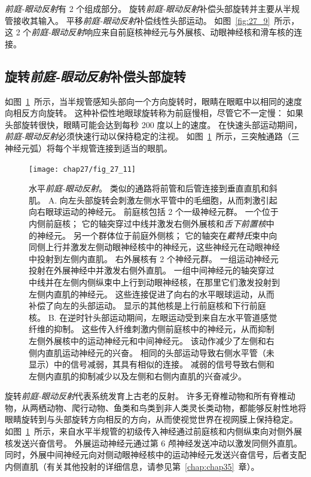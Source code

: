 \textit{前庭-眼动反射}有 2 个组成部分。
旋转\textit{前庭-眼动反射}补偿头部旋转并主要从半规管接收其输入。
平移\textit{前庭-眼动反射}补偿线性头部运动。
如图~\ref{fig:27_9}~所示，这 2 个\textit{前庭-眼动反射}响应来自前庭核神经元与外展核、动眼神经核和滑车核的连接。



\subsection{旋转\textit{前庭-眼动反射}补偿头部旋转}

如图~\ref{fig:27_11}~所示，当半规管感知头部向一个方向旋转时，眼睛在眼眶中以相同的速度向相反方向旋转。
这种补偿性地眼球旋转称为前庭慢相，尽管它不一定慢：
如果头部旋转很快，眼睛可能会达到每秒 200 度以上的速度。
在快速头部运动期间，\textit{前庭-眼动反射}必须快速行动以保持稳定的注视。
如图~\ref{fig:27_11}~所示，三突触通路（三神经元弧）将每个半规管连接到适当的眼肌。


\begin{figure}[htbp]
	\centering
	\texttt{[image: chap27/fig\_27\_11]}
	\caption{水平\textit{前庭-眼动反射}。
		类似的通路将前管和后管连接到垂直直肌和斜肌。
		A. 向左头部旋转会刺激左侧水平管中的毛细胞，从而刺激引起向右眼球运动的神经元。
		前庭核包括 2 个一级神经元群。
		一个位于内侧前庭核；
		它的轴突穿过中线并激发右侧外展核和\textit{舌下前置核}中的神经元。
		另一个群体位于前庭外侧核；
		它的轴突在\textit{戴特氏}束中向同侧上行并激发左侧动眼神经核中的神经元，这些神经元在动眼神经中投射到左侧内直肌。
		右外展核有 2 个神经元群。
		一组运动神经元投射在外展神经中并激发右侧外直肌。
		一组中间神经元的轴突穿过中线并在左侧内侧纵束中上行到动眼神经核，在那里它们激发投射到左侧内直肌的神经元。
		这些连接促进了向右的水平眼球运动，从而补偿了向左的头部运动。
		显示的其他核是上行前庭核和下行前庭核。
		B. 在逆时针头部运动期间，左眼运动受到来自左水平管道感觉纤维的抑制。
		这些传入纤维刺激内侧前庭核中的神经元，从而抑制左侧外展核中的运动神经元和中间神经元。
		该动作减少了左侧和右侧内直肌运动神经元的兴奋。
		相同的头部运动导致右侧水平管（未显示）中的信号减弱，其具有相似的连接。
		减弱的信号导致右侧和左侧内直肌的抑制减少以及左侧和右侧内直肌的兴奋减少\cite{sugiuchi2005vestibular}。}
	\label{fig:27_11}
\end{figure}


旋转\textit{前庭-眼动反射}代表系统发育上古老的反射。
许多无脊椎动物和所有脊椎动物，从两栖动物、爬行动物、鱼类和鸟类到非人类灵长类动物，都能够反射性地将眼睛旋转到与头部旋转方向相反的方向，从而使视觉世界在视网膜上保持稳定。
如图~\ref{fig:27_11}~所示，来自水平半规管的初级传入神经通过前庭核和内侧纵束向对侧外展核发送兴奋信号。
外展运动神经元通过第 6 颅神经发送冲动以激发同侧外直肌。
同时，外展中间神经元向对侧动眼神经核中的运动神经元发送兴奋信号，后者支配内侧直肌（有关其他投射的详细信息，请参见第~\ref{chap:chap35}~章）。


